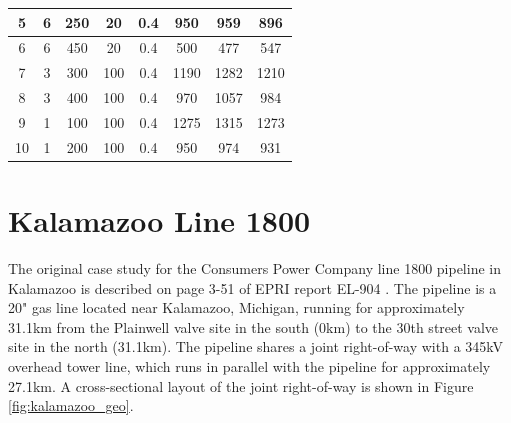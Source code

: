 \documentclass{article}
\begin{document}
\begin{table}[!htp]
\begin{tabular}{@{}cccccccc@{}}
5                              & 6                                              & 250                                      & 20                                                 & 0.4                                                    & 950              & 959	& 896                                                           \\ \midrule
6                              & 6                                              & 450                                      & 20                                                 & 0.4                                                    & 500              & 477	& 547                                                        \\ \midrule
7                              & 3                                              & 300                                      & 100                                                & 0.4                                                    & 1190             & 1282	& 1210                                                          \\ \midrule
8                              & 3                                              & 400                                      & 100                                                & 0.4                                                    & 970              & 1057	& 984                                                          \\ \midrule
9                             & 1                                              & 100                                      & 100                                                & 0.4                                                    & 1275             & 1315	& 1273                                                         \\ \midrule
10                             & 1                                              & 200                                      & 100                                                & 0.4                                                    & 950              & 974	& 931                                                           \\ \bottomrule
\end{tabular}
\end{table}

\newpage
\section{Kalamazoo Line 1800}
The original case study for the Consumers Power Company line 1800 pipeline in Kalamazoo is described on page 3-51 of EPRI report EL-904 \cite{EPRI_1978}. The pipeline is a 20" gas line located near Kalamazoo, Michigan, running for approximately 31.1km from the Plainwell valve site in the south (0km) to the 30th street valve site in the north (31.1km). The pipeline shares a joint right-of-way with a 345kV overhead tower line, which runs in parallel with the pipeline for approximately 27.1km. A cross-sectional layout of the joint right-of-way is shown in Figure \ref{fig:kalamazoo_geo}. 
\end{document}
